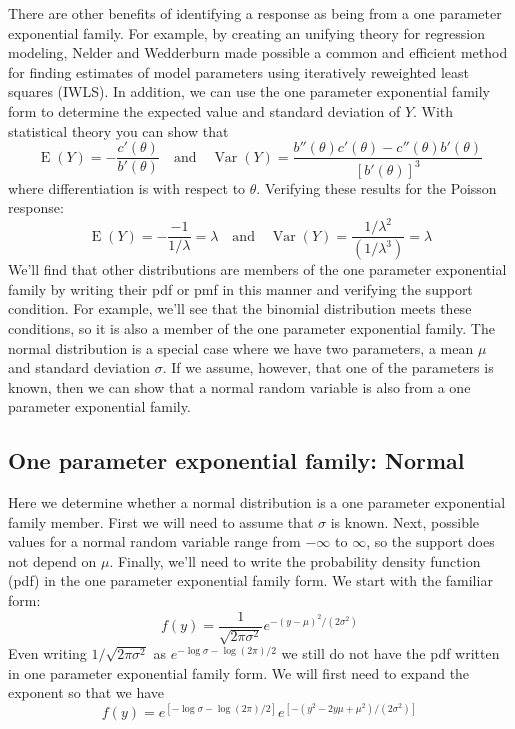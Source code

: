 \documentclass[
]{krantz}
\newcommand{\E}{\operatorname{E}}
\newcommand{\var}{\operatorname{Var}}
\begin{document}
There are other benefits of identifying a response as being from a one parameter exponential family. For example, by creating an unifying theory for regression modeling, Nelder and Wedderburn made possible a common and efficient method for finding estimates of model parameters using iteratively reweighted least squares (IWLS). In addition, we can use the one parameter exponential family form to determine the expected value and standard deviation of \(Y\). With statistical theory you can show that
\[\E(Y) =-\frac{c'(\theta)}{b'(\theta)} \quad \textrm{and} \quad \var(Y) =\frac{b''(\theta)c'(\theta)-c''(\theta)b'(\theta)}{[b'(\theta)]^3}
\]
where differentiation is with respect to \(\theta\). Verifying these results for the Poisson response:
\[\E(Y)=-\frac{-1}{1/\lambda}=\lambda \quad \textrm{and} \quad  \var(Y)=\frac{1/{{\lambda}^2}}
{(1/{\lambda}^3)}=\lambda
\]
We'll find that other distributions are members of the one parameter exponential family by writing their pdf or pmf in this manner and verifying the support condition. For example, we'll see that the binomial distribution meets these conditions, so it is also a member of the one parameter exponential family. The normal distribution is a special case where we have two parameters, a mean \(\mu\) and standard deviation \(\sigma\). If we assume, however, that one of the parameters is known, then we can show that a normal random variable is also from a one parameter exponential family.

\hypertarget{one-parameter-exponential-family-normal}{%
\subsection{One parameter exponential family: Normal}\label{one-parameter-exponential-family-normal}}

Here we determine whether a normal distribution is a one parameter exponential family member. First we will need to assume that \(\sigma\) is known. Next, possible values for a normal random variable range from \(-\infty\) to \(\infty\), so the support does not depend on \(\mu\). Finally, we'll need to write the probability density function (pdf) in the one parameter exponential family form. We start with the familiar form:
\[
f(y)=\frac{1}{{\sqrt{2\pi\sigma^2}}}{e^{-{(y-\mu)^2}/{(2\sigma^2)}}}
\]
Even writing \({1/{\sqrt{2\pi\sigma^2}}}\) as \(e^{-\log{\sigma}-\log(2\pi)/2}\) we still do not have the pdf written in one parameter exponential family form. We will first need to expand the exponent so that we have
\[
f(y)=e^{[-\log{\sigma}-\log(2\pi)/2]}{e^{[-{(y^2-2y\mu +\mu^2)}/{(2\sigma^2)}]}}
\]
\end{document}
